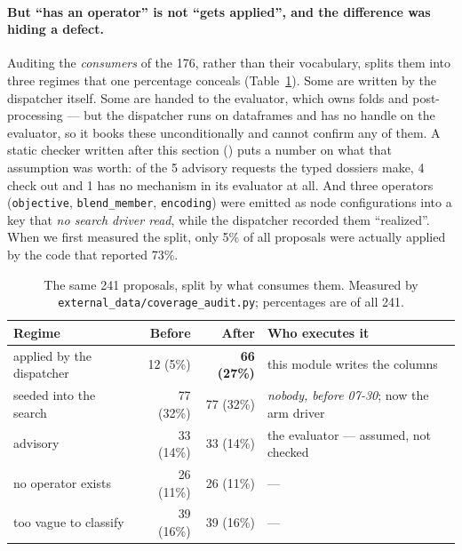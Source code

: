 \documentclass[11pt,a4paper]{article}
\begin{document}
\paragraph{But ``has an operator'' is not ``gets applied'', and the difference was hiding a defect.} Auditing the \emph{consumers} of the 176, rather than their vocabulary, splits them into three regimes that one percentage conceals (Table~\ref{tab:regime}). Some are written by the dispatcher itself. Some are handed to the evaluator, which owns folds and post-processing --- but the dispatcher runs on dataframes and has no handle on the evaluator, so it books these unconditionally and cannot confirm any of them. A static checker written after this section () puts a number on what that assumption was worth: of the 5 advisory requests the typed dossiers make, 4 check out and 1 has no mechanism in its evaluator at all. And three operators (\texttt{objective}, \texttt{blend\_member}, \texttt{encoding}) were emitted as node configurations into a key that \emph{no search driver read}, while the dispatcher recorded them ``realized''. When we first measured the split, only 5\% of all proposals were actually applied by the code that reported 73\%.

\begin{table}[H]
\centering\small
\caption{The same 241 proposals, split by what consumes them. Measured by \texttt{external\_data/coverage\_audit.py}; percentages are of all 241.}
\label{tab:regime}
\begin{tabular}{@{}lrrl@{}}
\toprule
\textbf{Regime} & \textbf{Before} & \textbf{After} & \textbf{Who executes it} \\
\midrule
applied by the dispatcher & 12 (5\%) & \textbf{66 (27\%)} & this module writes the columns \\
seeded into the search & 77 (32\%) & 77 (32\%) & \emph{nobody, before 07-30}; now the arm driver \\
advisory & 33 (14\%) & 33 (14\%) & the evaluator --- assumed, not checked \\
\midrule
no operator exists & 26 (11\%) & 26 (11\%) & --- \\
too vague to classify & 39 (16\%) & 39 (16\%) & --- \\
\bottomrule
\end{tabular}
\end{table}
\end{document}
